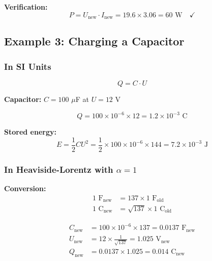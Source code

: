 	\textbf{Verification:}
	\begin{equation}
		P = U_{\text{new}} \cdot I_{\text{new}} = 19.6 \times 3.06 = 60 \text{ W} \quad \checkmark
	\end{equation}
	
	\subsection{Example 3: Charging a Capacitor}
	
	\subsubsection{In SI Units}
	
	\begin{equation}
		Q = C \cdot U
	\end{equation}
	
	\textbf{Capacitor:} $C = 100$ $\mu$F at $U = 12$ V
	
	\begin{equation}
		Q = 100 \times 10^{-6} \times 12 = 1.2 \times 10^{-3} \text{ C}
	\end{equation}
	
	\textbf{Stored energy:}
	\begin{equation}
		E = \frac{1}{2} C U^2 = \frac{1}{2} \times 100 \times 10^{-6} \times 144 = 7.2 \times 10^{-3} \text{ J}
	\end{equation}
	
	\subsubsection{In Heaviside-Lorentz with $\alpha = 1$}
	
	\textbf{Conversion:}
	\begin{align}
		1 \text{ F}_{\text{new}} &= 137 \times 1 \text{ F}_{\text{old}} \\
		1 \text{ C}_{\text{new}} &= \sqrt{137} \times 1 \text{ C}_{\text{old}}
	\end{align}
	
	\begin{align}
		C_{\text{new}} &= 100 \times 10^{-6} \times 137 = 0.0137 \text{ F}_{\text{new}} \\
		U_{\text{new}} &= 12 \times \frac{1}{\sqrt{137}} = 1.025 \text{ V}_{\text{new}} \\
		Q_{\text{new}} &= 0.0137 \times 1.025 = 0.014 \text{ C}_{\text{new}}
	\end{align}
	
